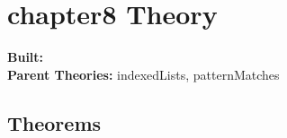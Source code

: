 \documentclass[11pt, twoside]{article}
\begin{document}


\tableofcontents
\cleardoublepage
\HOLpagestyle

\section{chapter8 Theory}
\begin{flushleft}
\textbf{Built:} \HOLchapterEightDate \\[2pt]
\textbf{Parent Theories:} indexedLists, patternMatches
\end{flushleft}



\subsection{Theorems}

\HOLchapterEightTheorems

\HOLindex
\end{document}
